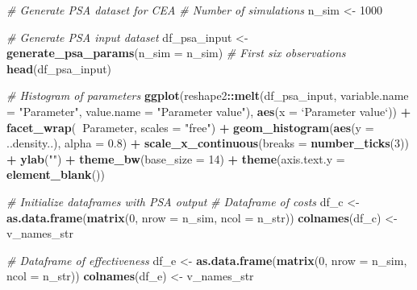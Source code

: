 \documentclass[]{article}
\newenvironment{Shaded}{\begin{snugshade}}{\end{snugshade}}
\newcommand{\KeywordTok}[1]{\textcolor[rgb]{0.13,0.29,0.53}{\textbf{#1}}}
\newcommand{\DataTypeTok}[1]{\textcolor[rgb]{0.13,0.29,0.53}{#1}}
\newcommand{\DecValTok}[1]{\textcolor[rgb]{0.00,0.00,0.81}{#1}}
\newcommand{\FloatTok}[1]{\textcolor[rgb]{0.00,0.00,0.81}{#1}}
\newcommand{\StringTok}[1]{\textcolor[rgb]{0.31,0.60,0.02}{#1}}
\newcommand{\CommentTok}[1]{\textcolor[rgb]{0.56,0.35,0.01}{\textit{#1}}}
\newcommand{\OperatorTok}[1]{\textcolor[rgb]{0.81,0.36,0.00}{\textbf{#1}}}
\newcommand{\NormalTok}[1]{#1}
\begin{document}
\begin{Shaded}
\begin{Highlighting}[]
\CommentTok{# Generate PSA dataset for CEA}
\CommentTok{# Number of simulations}
\NormalTok{n_sim <-}\StringTok{ }\DecValTok{1000}

\CommentTok{# Generate PSA input dataset}
\NormalTok{df_psa_input <-}\StringTok{ }\KeywordTok{generate_psa_params}\NormalTok{(}\DataTypeTok{n_sim =}\NormalTok{ n_sim)}
\CommentTok{# First six observations}
\KeywordTok{head}\NormalTok{(df_psa_input)}

\CommentTok{# Histogram of parameters}
\KeywordTok{ggplot}\NormalTok{(reshape2}\OperatorTok{::}\KeywordTok{melt}\NormalTok{(df_psa_input, }\DataTypeTok{variable.name =} \StringTok{"Parameter"}\NormalTok{, }
                      \DataTypeTok{value.name =} \StringTok{"Parameter value"}\NormalTok{), }
                      \KeywordTok{aes}\NormalTok{(}\DataTypeTok{x =} \StringTok{`}\DataTypeTok{Parameter value}\StringTok{`}\NormalTok{)) }\OperatorTok{+}
\StringTok{                      }\KeywordTok{facet_wrap}\NormalTok{(}\OperatorTok{~}\NormalTok{Parameter, }\DataTypeTok{scales =} \StringTok{"free"}\NormalTok{) }\OperatorTok{+}
\StringTok{                      }\KeywordTok{geom_histogram}\NormalTok{(}\KeywordTok{aes}\NormalTok{(}\DataTypeTok{y =}\NormalTok{ ..density..), }\DataTypeTok{alpha =} \FloatTok{0.8}\NormalTok{) }\OperatorTok{+}
\StringTok{                      }\KeywordTok{scale_x_continuous}\NormalTok{(}\DataTypeTok{breaks =} \KeywordTok{number_ticks}\NormalTok{(}\DecValTok{3}\NormalTok{)) }\OperatorTok{+}
\StringTok{                      }\KeywordTok{ylab}\NormalTok{(}\StringTok{""}\NormalTok{) }\OperatorTok{+}
\StringTok{                      }\KeywordTok{theme_bw}\NormalTok{(}\DataTypeTok{base_size =} \DecValTok{14}\NormalTok{) }\OperatorTok{+}
\StringTok{                      }\KeywordTok{theme}\NormalTok{(}\DataTypeTok{axis.text.y =} \KeywordTok{element_blank}\NormalTok{())                    }

\CommentTok{# Initialize dataframes with PSA output }
\CommentTok{# Dataframe of costs}
\NormalTok{df_c <-}\StringTok{ }\KeywordTok{as.data.frame}\NormalTok{(}\KeywordTok{matrix}\NormalTok{(}\DecValTok{0}\NormalTok{, }
                      \DataTypeTok{nrow =}\NormalTok{ n_sim,}
                      \DataTypeTok{ncol =}\NormalTok{ n_str))}
\KeywordTok{colnames}\NormalTok{(df_c) <-}\StringTok{ }\NormalTok{v_names_str}

\CommentTok{# Dataframe of effectiveness}
\NormalTok{df_e <-}\StringTok{ }\KeywordTok{as.data.frame}\NormalTok{(}\KeywordTok{matrix}\NormalTok{(}\DecValTok{0}\NormalTok{, }
                      \DataTypeTok{nrow =}\NormalTok{ n_sim,}
                      \DataTypeTok{ncol =}\NormalTok{ n_str))}
\KeywordTok{colnames}\NormalTok{(df_e) <-}\StringTok{ }\NormalTok{v_names_str}
\end{Highlighting}
\end{Shaded}
\end{document}
